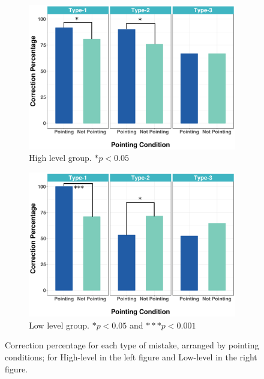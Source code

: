 \documentclass{sigchi}
\begin{document}
\begin{figure}[t]
\centering
\begin{subfigure}{.48\textwidth}
  \centering
  \includegraphics[width=0.95\linewidth]{figures/HcVpVt.pdf}
  \caption{High level group. $*p<0.05$}
  \label{fig:HighPointingVsTypeVsLevel}
\end{subfigure}%
\begin{subfigure}{.48\textwidth}
  \centering
  \includegraphics[width=0.95\linewidth]{figures/LcVpVt.pdf}
  \caption{Low level group. $*p<0.05$ and $***p<0.001$}
  \label{fig:LowPointingVsTypeVsLevel}
\end{subfigure}
\caption{Correction percentage for each type of mistake, arranged by pointing conditions; for High-level in the left figure and Low-level in the right figure.}
\label{fig:PointingVsTypeVsLevel}
\end{figure}
\end{document}
